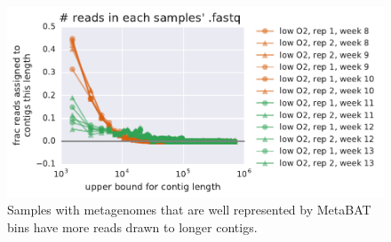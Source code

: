 \begin{figure}[H]
\centering
    \includegraphics[width=1.0\textwidth]{./tex/chapter2/figures/170124_bad_low_o2_samples_have_more_reads_on_short_contigs--binning_not_considered.pdf}
    \begin{singlespace}
    \caption[Samples best explained by bins have more reads drawn to longer contigs]{
        Samples with metagenomes that are well represented by MetaBAT bins have more reads drawn to longer contigs.}
    \label{fig:contig_dist}
    \end{singlespace}
\end{figure}



